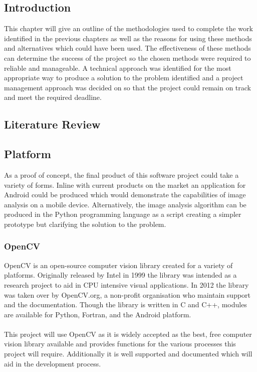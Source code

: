 \subsection{Introduction}
	This chapter will give an outline of the methodologies used to complete the work identified in the previous chapters as well as the reasons for using these methods and alternatives which could have been used. The effectiveness of these methods can determine the success of the project so the chosen methods were required to reliable and manageable. A technical approach was identified for the most appropriate way to produce a solution to the problem identified and a project management approach was decided on so that the project could remain on track and meet the required deadline.
\subsection{Literature Review}
\subsection{Platform}
	As a proof of concept, the final product of this software project could take a variety of forms. Inline with current products on the market an application for Android could be produced which would demonstrate the capabilities of image analysis on a mobile device. Alternatively, the image analysis algorithm can be produced in the Python programming language as a script creating a simpler prototype but clarifying the solution to the problem.
	\subsubsection{OpenCV}
		OpenCV is an open-source computer vision library created for a variety of platforms. Originally released by Intel in 1999 the library was intended as a research project to aid in CPU intensive visual applications. In 2012 the library was taken over by OpenCV.org, a non-profit organisation who maintain support and the documentation. Though the library is written in C and C++, modules are available for Python, Fortran, and the Android platform.
		\\\\
		This project will use OpenCV as it is widely accepted as the best, free computer vision library available and provides functions for the various processes this project will require. Additionally it is well supported and documented which will aid in the development process.
